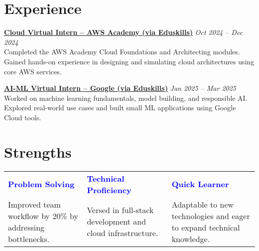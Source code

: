 \documentclass[a4paper,10pt]{article}
\begin{document}
\vspace{-0.4em}
\section*{Experience}
\textbf{\href{https://aictecert.eduskillsfoundation.org/pages/home/verify.php?cert=900f6c35bef91fd0d43463e96e0400a8}{Cloud Virtual Intern – AWS Academy (via Eduskills)}} \hfill \textit{Oct 2024 – Dec 2024} \\
Completed the AWS Academy Cloud Foundations and Architecting modules. Gained hands-on experience in designing and simulating cloud architectures using core AWS services.

\vspace{0.3em}
\textbf{\href{https://aictecert.eduskillsfoundation.org/pages/home/verify.php?cert=adfeefde2b3ca41257418d77ba4514e0}{AI-ML Virtual Intern – Google (via Eduskills)}} \hfill \textit{Jan 2025 – Mar 2025} \\
Worked on machine learning fundamentals, model building, and responsible AI. Explored real-world use cases and built small ML applications using Google Cloud tools.

\vspace{-0.4em}
\section*{Strengths}
\begin{tabularx}{\textwidth}{XXX}
\textbf{\textcolor{blue}{Problem Solving}} & \textbf{\textcolor{blue}{Technical Proficiency}} & \textbf{\textcolor{blue}{Quick Learner}} \\
Improved team workflow by 20\% by addressing bottlenecks. & Versed in full-stack development and cloud infrastructure. & Adaptable to new technologies and eager to expand technical knowledge.
\end{tabularx}
\normalsize

\vspace{-0.5em}
\end{document}
